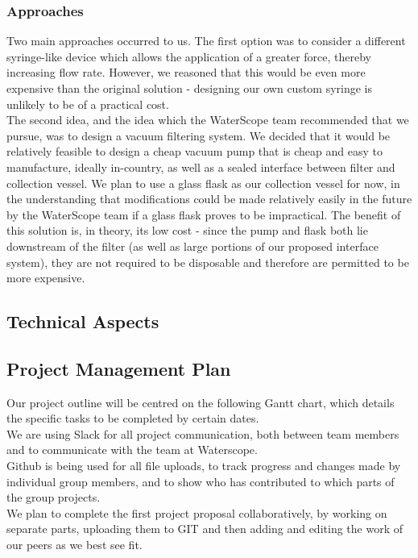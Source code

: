 \documentclass[12pt]{article}
\begin{document}
\subsubsection{Approaches}
Two main approaches occurred to us. The first option was to consider a different syringe-like device which allows the application of a greater force, thereby increasing flow rate. However, we reasoned that this would be even more expensive than the original solution - designing our own custom syringe is unlikely to be of a practical cost.\\
The second idea, and the idea which the WaterScope team recommended that we pursue, was to design a vacuum filtering system. We decided that it would be relatively feasible to design a cheap vacuum pump that is cheap and easy to manufacture, ideally in-country, as well as a sealed interface between filter and collection vessel. We plan to use a glass flask as our collection vessel for now, in the understanding that modifications could be made relatively easily in the future by the WaterScope team if a glass flask proves to be impractical. The benefit of this solution is, in theory, its low cost - since the pump and flask both lie downstream of the filter (as well as large portions of our proposed interface system), they are not required to be disposable and therefore are permitted to be more expensive.
\subsection{Technical Aspects}

\subsection{Project Management Plan}
Our project outline will be centred on the following Gantt chart, which details the specific tasks to be completed by certain dates.\\
We are using Slack for all project communication, both between team members and to communicate with the team at Waterscope.\\
Github is being used for all file uploads, to track progress and changes made by individual group members, and to show who has contributed to which parts of the group projects.\\
We plan to complete the first project proposal collaboratively, by working on separate parts, uploading them to GIT and then adding and editing the work of our peers as we best see fit.
\end{document}
